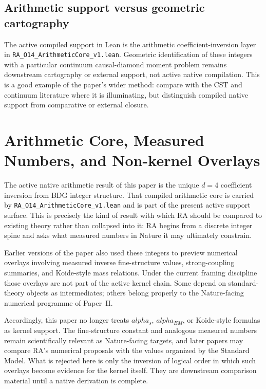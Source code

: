 \documentclass[11pt]{article}
\def\alpha{alpha}%
\def\mathrm#1{#1}%
\begin{document}
\subsection{Arithmetic support versus geometric cartography}

The active compiled support in Lean is the arithmetic coefficient-inversion layer in \texttt{RA\_O14\_ArithmeticCore\_v1.lean}. Geometric identification of these integers with a particular continuum causal-diamond moment problem remains downstream cartography or external support, not active native compilation. This is a good example of the paper's wider method: compare with the CST and continuum literature where it is illuminating, but distinguish compiled native support from comparative or external closure.

\section{Arithmetic Core, Measured Numbers, and Non-kernel Overlays}
\label{sec:couplings}

The active native arithmetic result of this paper is the unique $d=4$ coefficient inversion from BDG integer structure. That compiled arithmetic core is carried by \texttt{RA\_O14\_ArithmeticCore\_v1.lean} and is part of the present active support surface. This is precisely the kind of result with which RA should be compared to existing theory rather than collapsed into it: RA begins from a discrete integer spine and asks what measured numbers in Nature it may ultimately constrain.

Earlier versions of the paper also used these integers to preview numerical overlays involving measured inverse fine-structure values, strong-coupling summaries, and Koide-style mass relations. Under the current framing discipline those overlays are not part of the active kernel chain. Some depend on standard-theory objects as intermediates; others belong properly to the Nature-facing numerical programme of Paper~II.

Accordingly, this paper no longer treats $\alpha_s$, $\alpha_{\mathrm{EM}}$, or Koide-style formulas as kernel support. The fine-structure constant and analogous measured numbers remain scientifically relevant as Nature-facing targets, and later papers may compare RA's numerical proposals with the values organized by the Standard Model. What is rejected here is only the inversion of logical order in which such overlays become evidence for the kernel itself. They are downstream comparison material until a native derivation is complete.
\end{document}
